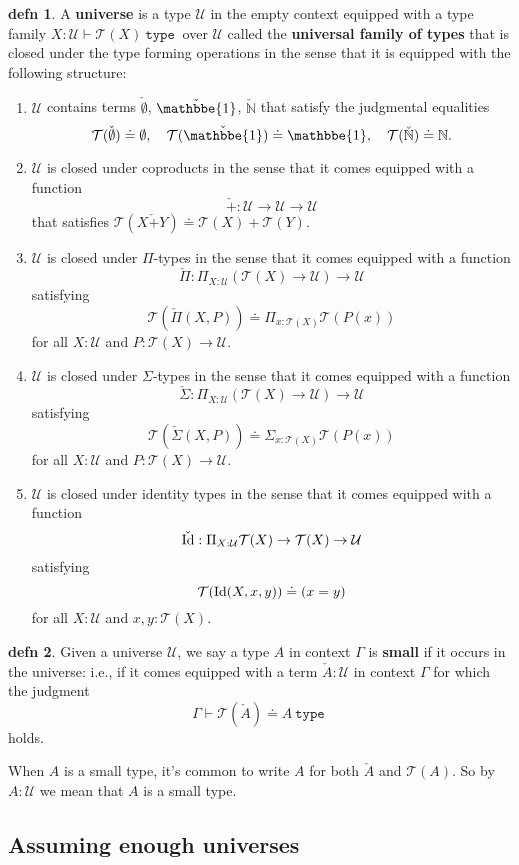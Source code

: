 \documentclass{amsart}
\theoremstyle{theorem}
\theoremstyle{definition}
\newtheorem*{defn}{defn}
\theoremstyle{remark}
\newcommand{\0}{\mathbbe{0}}
\newcommand{\1}{\mathbbe{1}}
\newcommand{\2}{\mathbbe{2}}
\newcommand{\3}{\mathbbe{3}}
\newcommand{\4}{\mathbbe{4}}
\newcommand{\univ}{{~\texttt{type}~}}
\newcommand{\bN}{{\mathbb{N}}}
\newcommand{\UU}{{\mathcal{U}}}
\newcommand{\sT}{\mathcal{T}}
\newcommand{\Id}{\textup{\text{Id}}}
\begin{document}
\begin{defn} A \textbf{universe} is a type $\UU$ in the empty context equipped with a type family $X : \UU \vdash \sT(X) \univ$ over $\UU$ called the \textbf{universal family of types} that is closed under the type forming operations in the sense that it is equipped with the following structure:
\begin{enumerate}
\item $\UU$ contains terms $\check{\emptyset}$, $\check{\1}$, $\check{\bN}$ that satisfy the judgmental equalities
\[ \sT(\check{\emptyset}) \doteq \emptyset, \quad \sT(\check{\1}) \doteq \1, \quad \sT(\check{\bN}) \doteq \bN.\]
\item $\UU$ is closed under coproducts in the sense that it comes equipped with a function
\[ \check{+} \colon \UU \to \UU \to \UU\] that satisfies $\sT(X\check{+}Y) \doteq \sT(X) + \sT(Y)$.
\item $\UU$ is closed under $\Pi$-types in the sense that it comes equipped with a function
\[ \check{\Pi} \colon \Pi_{X: \UU} (\sT(X) \to \UU) \to \UU\] satisfying
\[ \sT(\check{\Pi}(X,P)) \doteq \Pi_{x : \sT(X)} \sT(P(x))\]
for all $X : \UU$ and $P \colon \sT(X) \to \UU$.
\item $\UU$ is closed under $\Sigma$-types in the sense that it comes equipped with a function
\[ \check{\Sigma} \colon \Pi_{X: \UU} (\sT(X) \to \UU) \to \UU\] satisfying
\[ \sT(\check{\Sigma}(X,P)) \doteq \Sigma_{x : \sT(X)} \sT(P(x))\]
for all $X : \UU$ and $P \colon \sT(X) \to \UU$.
\item $\UU$ is closed under identity types in the sense that it comes equipped with a function
\[ \check{\Id} : \Pi_{X : \UU} \sT(X) \to \sT(X) \to \UU\]
satisfying
\[ \sT(\Id(X,x,y)) \doteq (x = y)\]
for all $X: \UU$ and $x,y : \sT(X)$.
\end{enumerate}
\end{defn} 

\begin{defn} Given a universe $\UU$, we say a type $A$ in context $\Gamma$ is \textbf{small} if it occurs in the universe: i.e., if it comes equipped with a term $\check{A} : \UU$ in context $\Gamma$ for which the judgment
\[ \Gamma \vdash \sT(\check{A}) \doteq A \univ\]
holds. 
\end{defn}

When $A$ is a small type, it's common to write $A$ for both $\check{A}$ and $\sT(A)$. So by $A : \UU$ we mean that $A$ is a small type.

\subsection*{Assuming enough universes}
\end{document}
